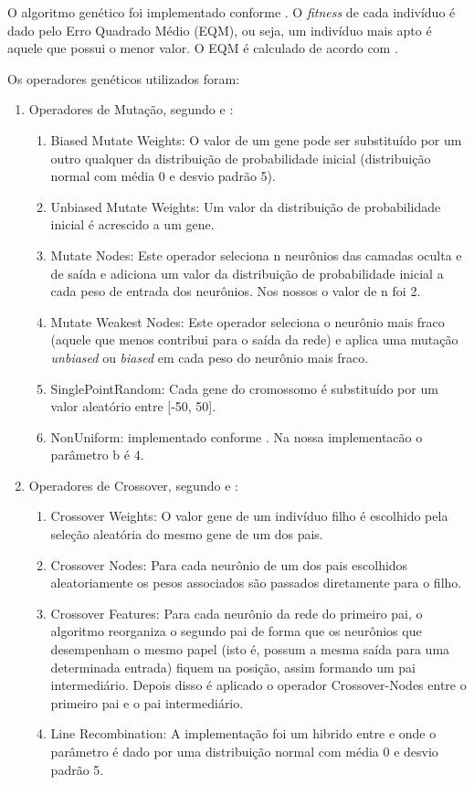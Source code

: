 \documentclass[12pt]{article}
\begin{document}
\par O algoritmo genético foi implementado conforme \cite{essentials}. O \textit{fitness} de cada indivíduo é dado pelo Erro Quadrado Médio (EQM), ou seja, um indivíduo mais apto é aquele que possui o menor valor. O EQM é calculado de acordo com \cite{Liu}.


\par Os operadores genéticos utilizados foram:
\begin{enumerate}
	\item Operadores de Mutação, segundo \cite{montana} e \cite{Liu}:
	\begin{enumerate}
		\item Biased Mutate Weights: O valor de um gene pode ser substituído por um outro qualquer da distribuição de probabilidade inicial (distribuição normal com média 0 e desvio padrão 5).
		\item Unbiased Mutate Weights: Um valor da distribuição de probabilidade inicial é acrescido a um gene.
		\item Mutate Nodes: Este operador seleciona n neurônios das camadas oculta e de saída e adiciona um valor da distribuição de probabilidade inicial a cada peso de entrada dos neurônios. Nos nossos o valor de n foi 2.
		\item Mutate Weakest Nodes: Este operador seleciona o neurônio mais fraco (aquele que menos contribui para o saída da rede) e aplica uma mutação \textit{unbiased} ou \textit{biased} em cada peso do neurônio mais fraco.
		\item SinglePointRandom: Cada gene do cromossomo é substituído por um valor aleatório entre [-50, 50].
		\item NonUniform: implementado conforme \cite{Michalewicz}. Na nossa implementacão o parâmetro b é 4.
		
	\end{enumerate}

	\item Operadores de Crossover, segundo \cite{montana} e \cite{Liu}:
	\begin{enumerate}
		\item Crossover Weights: O valor gene de um indivíduo filho é escolhido pela seleção aleatória do mesmo gene de um dos pais.
		\item Crossover Nodes: Para cada neurônio de um dos pais escolhidos aleatoriamente os pesos associados são passados diretamente para o filho.
		\item Crossover Features: Para cada neurônio da rede do primeiro pai, o algoritmo reorganiza o segundo pai de forma que os neurônios que desempenham o mesmo papel (isto é, possum a mesma saída para uma determinada entrada) fiquem na posição, assim formando um pai intermediário. Depois disso é aplicado o operador Crossover-Nodes entre o primeiro pai e o pai intermediário.
		\item Line Recombination: A implementação foi um hibrido entre \cite{Liu} e \cite{essentials} onde o parâmetro é dado por uma distribuição normal com média 0 e desvio padrão 5.
	\end{enumerate}

\end{enumerate}
\end{document}
